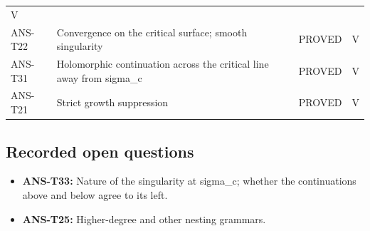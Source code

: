 \documentclass[
  11pt,
]{article}
\providecommand{\tightlist}{%
  \setlength{\itemsep}{0pt}\setlength{\parskip}{0pt}}
\begin{document}
\begin{longtable}[]{@{}llll@{}}
\begin{minipage}[t]{0.10\columnwidth}
V\strut
\end{minipage}\tabularnewline
\begin{minipage}[t]{0.16\columnwidth}\raggedright
ANS-T22\strut
\end{minipage} & \begin{minipage}[t]{0.41\columnwidth}\raggedright
Convergence on the critical surface; smooth singularity\strut
\end{minipage} & \begin{minipage}[t]{0.22\columnwidth}\raggedright
PROVED\strut
\end{minipage} & \begin{minipage}[t]{0.10\columnwidth}\raggedright
V\strut
\end{minipage}\tabularnewline
\begin{minipage}[t]{0.16\columnwidth}\raggedright
ANS-T31\strut
\end{minipage} & \begin{minipage}[t]{0.41\columnwidth}\raggedright
Holomorphic continuation across the critical line away from
sigma\_c\strut
\end{minipage} & \begin{minipage}[t]{0.22\columnwidth}\raggedright
PROVED\strut
\end{minipage} & \begin{minipage}[t]{0.10\columnwidth}\raggedright
V\strut
\end{minipage}\tabularnewline
\begin{minipage}[t]{0.16\columnwidth}\raggedright
ANS-T21\strut
\end{minipage} & \begin{minipage}[t]{0.41\columnwidth}\raggedright
Strict growth suppression\strut
\end{minipage} & \begin{minipage}[t]{0.22\columnwidth}\raggedright
PROVED\strut
\end{minipage} & \begin{minipage}[t]{0.10\columnwidth}\raggedright
V\strut
\end{minipage}\tabularnewline
\bottomrule
\end{longtable}

\hypertarget{recorded-open-questions-2}{%
\subsection{Recorded open questions}\label{recorded-open-questions-2}}

\begin{itemize}
\tightlist
\item
  \textbf{ANS-T33:} Nature of the singularity at sigma\_c; whether the
  continuations above and below agree to its left.
\item
  \textbf{ANS-T25:} Higher-degree and other nesting grammars.
\end{itemize}
\end{document}
